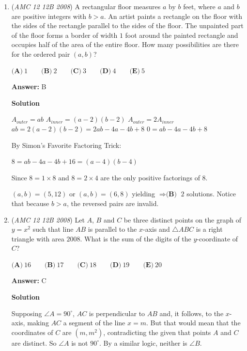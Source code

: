 \begin{enumerate}
 The area of the largest square is $(1+\sqrt{3})^2=4+2\sqrt{3}$. The area of region $R$ is $1+12\frac{1}{2}\frac{\sqrt{3}}{2}=1+3\sqrt{3}$. The total area of four small 45-45-90 triangles at corner is $4*\frac{1}{2}(\frac{\sqrt{3}+1-2}{2})^2=2-\sqrt{3}$. $S=4+2\sqrt{3}-(2-\sqrt{3})=2+3\sqrt{3}$, $S-R=1$.

 


	\item (\textit{AMC 12 12B 2008}) A rectangular floor measures $a$ by $b$ feet, where $a$ and $b$ are positive integers with $b > a$. An artist paints a rectangle on the floor with the sides of the rectangle parallel to the sides of the floor. The unpainted part of the floor forms a border of width $1$ foot around the painted rectangle and occupies half of the area of the entire floor. How many possibilities are there for the ordered pair $(a,b)$?


 $\textbf{(A)}\ 1\qquad\textbf{(B)}\ 2\qquad\textbf{(C)}\ 3\qquad\textbf{(D)}\ 4\qquad\textbf{(E)}\ 5$

 \textbf{Answer: }B



\textbf{Solution}

$A_{outer}=ab$
$A_{inner}=(a-2)(b-2)$
$A_{outer}=2A_{inner}$
$ab=2(a-2)(b-2)=2ab-4a-4b+8$
$0=ab-4a-4b+8$

 By Simon's Favorite Factoring Trick:

 $8=ab-4a-4b+16=(a-4)(b-4)$

 Since $8=1\times8$ and $8=2\times4$ are the only positive factorings of $8$.

 $(a,b)=(5,12)$ or $(a,b)=(6,8)$ yielding $\Rightarrow\textbf{(B)}$ $2$ solutions. Notice that because $b>a$, the reversed pairs are invalid.

 


	\item (\textit{AMC 12 12B 2008}) Let $A$, $B$ and $C$ be three distinct points on the graph of $y=x^2$ such that line $AB$ is parallel to the $x$-axis and $\triangle ABC$ is a right triangle with area $2008$. What is the sum of the digits of the $y$-coordinate of $C$?


 $\textbf{(A)}\ 16\qquad\textbf{(B)}\ 17\qquad\textbf{(C)}\ 18\qquad\textbf{(D)}\ 19\qquad\textbf{(E)}\ 20$

 \textbf{Answer: }C



\textbf{Solution}

Supposing $\angle A=90^\circ$, $AC$ is perpendicular to $AB$ and, it follows, to the $x$-axis, making $AC$  a segment of the line $x=m$. But that would mean that the coordinates of $C$ are $(m, m^2)$, contradicting the given that points $A$ and $C$ are distinct. So $\angle A$ is not $90^\circ$. By a similar logic, neither is $\angle B$. 


\end{enumerate}
